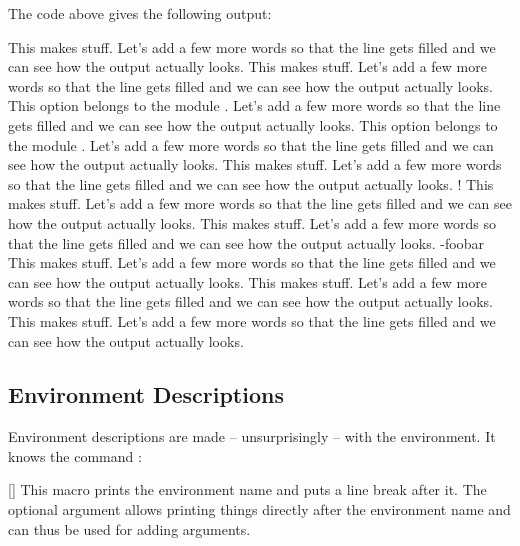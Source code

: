 \documentclass[load-preamble+,babel-options={ngerman,english}]{cnltx-doc}
\begin{document}
The code above gives the following output:
\begin{options}
    This makes stuff.  Let's add a few more words so that the line gets
    filled and we can see how the output actually looks.
    This makes stuff.  Let's add a few more words so that the line gets
    filled and we can see how the output actually looks.
    This option belongs to the module .  Let's add a few more
    words so that the line gets filled and we can see how the output actually
    looks.
    This option belongs to the module .  Let's add a few more
    words so that the line gets filled and we can see how the output actually
    looks.
  \Default
    This makes stuff.  Let's add a few more words so that the line gets
    filled and we can see how the output actually looks.
  \Default!
    This makes stuff.  Let's add a few more words so that the line gets
    filled and we can see how the output actually looks.
    This makes stuff.  Let's add a few more words so that the line gets
    filled and we can see how the output actually looks.
  \keyval-{foo}{bar}
    This makes stuff.  Let's add a few more words so that the line gets
    filled and we can see how the output actually looks.
    This makes stuff.  Let's add a few more words so that the line gets
    filled and we can see how the output actually looks.
    This makes stuff.  Let's add a few more words so that the line gets
    filled and we can see how the output actually looks.
\end{options}

\subsection{Environment Descriptions}\label{sec:usage:environments}
Environment descriptions are made -- unsurprisingly -- with the
 environment.  It knows the command :

\begin{commands}
  [\sarg{}]
    This macro prints the environment name and puts a line break
    after it.  The optional argument allows printing things directly after the
    environment name and can thus be used for adding arguments.
\end{commands}
\end{document}
